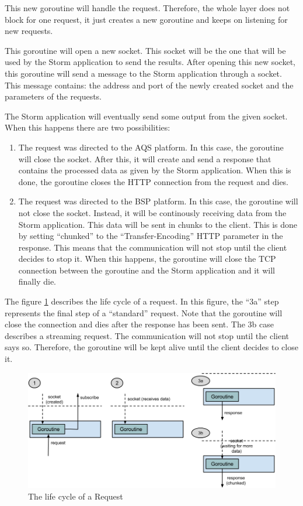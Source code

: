 This new goroutine will handle the request. Therefore, the whole layer does not
block for one request, it just creates a new goroutine and keeps on listening
for new requests.

This goroutine will open a new socket. This socket will be the one that will be
used by the Storm application to send the results. After opening this new
socket, this goroutine will send a message to the Storm application through a
socket. This message contains: the address and port of the newly created socket
and the parameters of the requests.

The Storm application will eventually send some output from the given socket.
When this happens there are two possibilities:

\begin{enumerate}
  \itemsep0em
  \item The request was directed to the \ac{AQS} platform. In this case, the
goroutine will close the socket. After this, it will create and send a response
that contains the processed data as given by the Storm application. When this
is done, the goroutine closes the HTTP connection from the request and dies.
  \item The request was directed to the \ac{BSP} platform. In this case, the
goroutine will not close the socket. Instead, it will be continously receiving
data from the Storm application. This data will be sent in chunks to the
client. This is done by setting ``chunked'' to the ``Transfer-Encoding'' HTTP
parameter in the response. This means that the communication will not stop
until the client decides to stop it. When this happens, the goroutine will
close the TCP connection between the goroutine and the Storm application and it
will finally die.
\end{enumerate}

The figure \ref{fig:api} describes the life cycle of a request. In this figure,
the ``3a'' step represents the final step of a ``standard'' request. Note that
the goroutine will close the connection and dies after the response has been
sent. The 3b case describes a streaming request. The communication will not
stop until the client says so. Therefore, the goroutine will be kept alive
until the client decides to close it.

\begin{figure}[H]
  \centering
  \includegraphics[scale=0.6]{implementation/images/api.png}
  \caption{The life cycle of a Request}\label{fig:api}
\end{figure}
